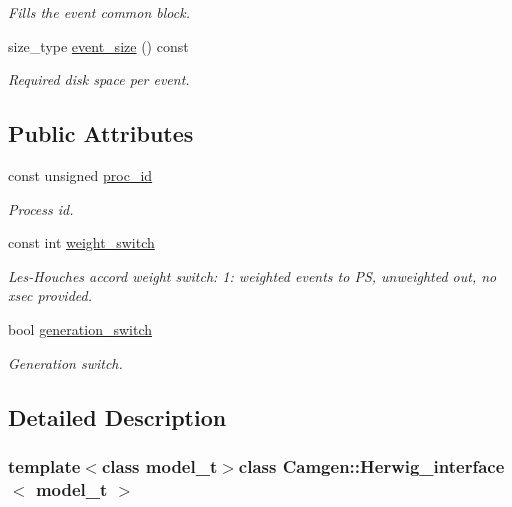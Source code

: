 \begin{DoxyCompactItemize}
\begin{DoxyCompactList}\small\item\em Fills the event common block. \end{DoxyCompactList}\item 
\hypertarget{a00279_a89bbbf1a35a57ada1275fa6e4c59e82b}{size\-\_\-type \hyperlink{a00279_a89bbbf1a35a57ada1275fa6e4c59e82b}{event\-\_\-size} () const }\label{a00279_a89bbbf1a35a57ada1275fa6e4c59e82b}

\begin{DoxyCompactList}\small\item\em Required disk space per event. \end{DoxyCompactList}\end{DoxyCompactItemize}
\subsection*{Public Attributes}
\begin{DoxyCompactItemize}
\item 
\hypertarget{a00279_a44e06946b527bf8bb1c2edc2ee48060c}{const unsigned \hyperlink{a00279_a44e06946b527bf8bb1c2edc2ee48060c}{proc\-\_\-id}}\label{a00279_a44e06946b527bf8bb1c2edc2ee48060c}

\begin{DoxyCompactList}\small\item\em Process id. \end{DoxyCompactList}\item 
const int \hyperlink{a00279_a2dedaf0e690349d499044ca1aa0ab95b}{weight\-\_\-switch}
\begin{DoxyCompactList}\small\item\em Les-\/\-Houches accord weight switch\-: 1\-: weighted events to P\-S, unweighted out, no xsec provided. \end{DoxyCompactList}\item 
bool \hyperlink{a00279_a6fd3ab282136d8ceb709e5030e9f48a3}{generation\-\_\-switch}
\begin{DoxyCompactList}\small\item\em Generation switch. \end{DoxyCompactList}\end{DoxyCompactItemize}


\subsection{Detailed Description}
\subsubsection*{template$<$class model\-\_\-t$>$class Camgen\-::\-Herwig\-\_\-interface$<$ model\-\_\-t $>$}

